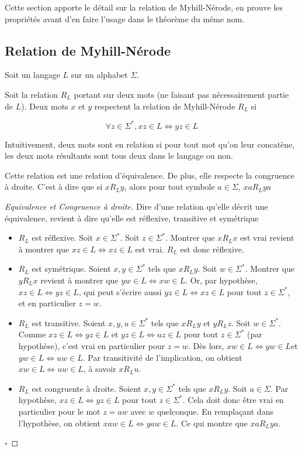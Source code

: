 Cette section apporte le détail sur la relation de Myhill-Nérode, en prouve les propriétés avant d'en faire l'usage dans le théorème du même nom.




\subsection{Relation de Myhill-Nérode}

Soit un langage $L$ sur un alphabet $\Sigma$.

Soit la relation $R_L$ portant sur deux mots (ne faisant pas nécessairement partie de $L$). Deux mots $x$ et $y$ respectent la relation de Myhill-Nérode $R_L$ si 

$$\forall z \in \Sigma^*, xz \in L \Leftrightarrow yz \in L$$

Intuitivement, deux mots sont en relation si pour tout mot qu'on leur concatène, les deux mots résultants sont tous deux dans le langage ou non.

\begin{lemma}
	Cette relation est une relation d'équivalence. De plus, elle respecte la congruence à droite. C'est à dire que si $xR_Ly$, alors pour tout symbole $a \in \Sigma$, $xaR_Lya$
\end{lemma}

\begin{proof}[Equivalence et Congruence à droite]
	Dire d'une relation qu'elle décrit une équivalence, revient à dire qu'elle est réflexive, transitive et symétrique
\begin{itemize}
		\item $R_L$ est réflexive. Soit $x \in \Sigma^*$. Soit $z \in \Sigma^*$. Montrer que $xR_Lx$ est vrai revient à montrer que $ xz \in L \Leftrightarrow xz \in L$ est vrai. $R_L$ est donc réflexive.
		\item $R_L$ est symétrique. Soient $x, y \in \Sigma^*$ tels que $xR_Ly$. Soit $w \in \Sigma^*$. Montrer que $yR_Lx$ revient à montrer que $ yw \in L \Leftrightarrow xw \in L$. Or, par hypothèse, $ xz \in L \Leftrightarrow yz \in L$, qui peut s'écrire aussi $ yz \in L \Leftrightarrow xz \in L$ pour tout $z \in \Sigma^*$, et en particulier $z=w$.
		\item $R_L$ est transitive. Soient $x,y,u \in \Sigma^*$ tels que $xR_Ly$ et $yR_Lz$. Soit $w \in \Sigma^*$. Comme $ xz \in L \Leftrightarrow yz \in L$ et $ yz \in L \Leftrightarrow uz \in L$ pour tout $z \in \Sigma^*$ (par hypothèse), c'est vrai en particulier pour $z=w$. Dès lors,  $ xw \in L \Leftrightarrow yw \in L$et $ yw \in L \Leftrightarrow uw \in L$. Par transitivité de l'implication, on obtient $ xw \in L \Leftrightarrow uw \in L$, à savoir $xR_Lu$.
		\item $R_L$ est congruente à droite. Soient $x,y \in \Sigma^*$ tels que $xR_Ly$. Soit $a \in \Sigma$. Par hypothèse, $ xz \in L \Leftrightarrow yz \in L$ pour tout $z \in \Sigma^*$. Cela doit donc être vrai en particulier pour le mot $z=aw$ avec $w$ quelconque. En remplaçant dans l'hypothèse, on obtient  $ xaw \in L \Leftrightarrow yaw \in L$. Ce qui montre que $xaR_Lya$.
	\end{itemize}

\hfill$\square$
\end{proof}


